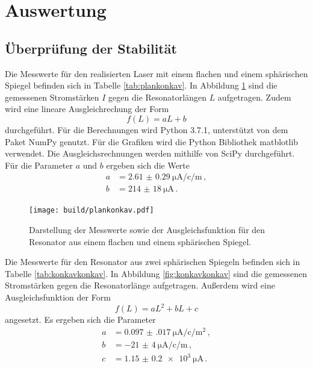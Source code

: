 \section{Auswertung}
\label{sec:Auswertung}

\subsection{Überprüfung der Stabilität}
\label{subsec:stabilitaet}
Die Messwerte für den realisierten Laser mit einem flachen und einem sphärischen
Spiegel befinden sich in Tabelle \ref{tab:plankonkav}. In Abbildung \ref{fig:plankonkav}
sind die gemessenen Stromstärken $I$ gegen die Resonatorlängen $L$ aufgetragen.
Zudem wird eine lineare Ausgleichrechung der Form
\begin{equation*}
  f(L)=a L+b
\end{equation*}
durchgeführt. Für die Berechnungen wird Python 3.7.1, unterstützt von dem Paket
NumPy \cite{numpy} genutzt. Für die Grafiken
wird die Python Bibliothek matblotlib \cite{matplotlib} verwendet.
Die Ausgleichsrechnungen werden mithilfe von SciPy \cite{scipy} durchgeführt.
Für die Parameter $a$ und $b$ ergeben sich die Werte
\begin{align*}
  a&= \SI{2.61(029)}{\micro\ampere\per\centi\per\metre}\,,\\
  b&= \SI{214(18)}{\micro\ampere}\,.
\end{align*}

\begin{figure}
  \centering
  \texttt{[image: build/plankonkav.pdf]}
  \caption{Darstellung der Messwerte sowie der Ausgleichsfunktion für den
  Resonator aus einem flachen und einem sphärischen Spiegel.}
  \label{fig:plankonkav}
\end{figure}

Die Messwerte für den Resonator aus zwei sphärischen Spiegeln befinden sich in
Tabelle \ref{tab:konkavkonkav}. In Abbildung \ref{fig:konkavkonkav} sind die gemessenen Stromstärken gegen die Resonatorlänge aufgetragen. Außerdem wird eine
Ausgleichsfunktion der Form
\begin{equation*}
  f(L)=a L^2 + b L + c
\end{equation*}
angesetzt. Es ergeben sich die Parameter
\begin{align*}
  a&= \SI{0.097(017)}{\micro\ampere\per\centi\per\metre\squared}\,, \\
  b&= \SI{-21(4)}{\micro\ampere\per\centi\per\metre}\,, \\
  c&= \SI{1.15(020)e3}{\micro\ampere}\,.
\end{align*}

